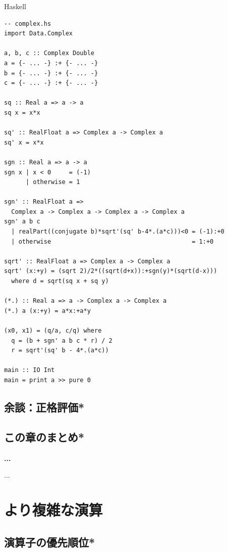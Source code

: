 \documentclass[a5paper,twoside,fleqn,draft]{jsbook}
\newcommand{\programminglanguage}[1]{\textsf{#1}}
\newcommand{\haskell}{\programminglanguage{Haskell}}
\newenvironment{note}[1]{\begin{boxnote}\begin{center}\textbf{#1}\end{center}}{\end{boxnote}}
\newenvironment{haskellcode}{\begin{itembox}[r]{\haskell}}{\end{itembox}}
\begin{document}
\begin{haskellcode}
\begin{verbatim}
-- complex.hs
import Data.Complex

a, b, c :: Complex Double
a = {- ... -} :+ {- ... -}
b = {- ... -} :+ {- ... -}
c = {- ... -} :+ {- ... -}

sq :: Real a => a -> a
sq x = x*x

sq' :: RealFloat a => Complex a -> Complex a
sq' x = x*x

sgn :: Real a => a -> a
sgn x | x < 0     = (-1)
      | otherwise = 1

sgn' :: RealFloat a =>
  Complex a -> Complex a -> Complex a -> Complex a
sgn' a b c
  | realPart((conjugate b)*sqrt'(sq' b-4*.(a*c)))<0 = (-1):+0
  | otherwise                                       = 1:+0

sqrt' :: RealFloat a => Complex a -> Complex a
sqrt' (x:+y) = (sqrt 2)/2*((sqrt(d+x)):+sgn(y)*(sqrt(d-x)))
  where d = sqrt(sq x + sq y)

(*.) :: Real a => a -> Complex a -> Complex a
(*.) a (x:+y) = a*x:+a*y

(x0, x1) = (q/a, c/q) where
  q = (b + sgn' a b c * r) / 2
  r = sqrt'(sq' b - 4*.(a*c))

main :: IO Int
main = print a >> pure 0
\end{verbatim}
\end{haskellcode}

\section{余談：正格評価*}


\section{この章のまとめ*}

\begin{note}{...}
...
\end{note}

\chapter{より複雑な演算}
\label{ch:more-arithmetic}

\section{演算子の優先順位*}
\end{document}
